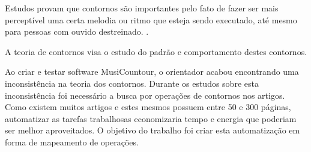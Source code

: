 \documentclass[11pt]{article}
\begin{document}

Estudos provam que contornos são importantes pelo fato de fazer ser
mais perceptível uma certa melodia ou ritmo que esteja sendo executado,
até mesmo para pessoas com ouvido destreinado.
\cite[p. 225]{Marvin87}.

A teoria de contornos visa o estudo do padrão e comportamento destes contornos.








Ao criar e testar software MusiCountour, o orientador acabou encontrando uma inconsistência
na teoria dos contornos. Durante os estudos sobre esta inconsistência foi necessário a busca 
por operações de contornos nos artigos. Como existem muitos artigos e estes mesmos possuem 
entre 50 e 300 páginas, automatizar as tarefas trabalhosas economizaria tempo e energia 
que poderiam ser melhor aproveitados. O objetivo do trabalho foi criar esta automatização 
em forma de mapeamento de operações.
\end{document}

